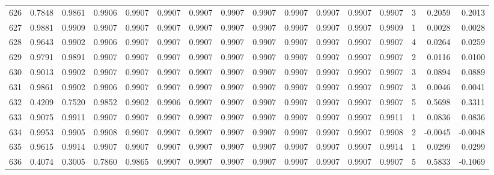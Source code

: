 \begin{tabular}{lrrrrrrrrrrrrrrr}
626 &      0.7848 &  0.9861 &  0.9906 &  0.9907 &  0.9907 &  0.9907 &  0.9907 &  0.9907 &  0.9907 &  0.9907 &   0.9907 &     0.9907 &      3 &                    0.2059 &                     0.2013 \\
627 &      0.9881 &  0.9909 &  0.9907 &  0.9907 &  0.9907 &  0.9907 &  0.9907 &  0.9907 &  0.9907 &  0.9907 &   0.9907 &     0.9909 &      1 &                    0.0028 &                     0.0028 \\
628 &      0.9643 &  0.9902 &  0.9906 &  0.9907 &  0.9907 &  0.9907 &  0.9907 &  0.9907 &  0.9907 &  0.9907 &   0.9907 &     0.9907 &      4 &                    0.0264 &                     0.0259 \\
629 &      0.9791 &  0.9891 &  0.9907 &  0.9907 &  0.9907 &  0.9907 &  0.9907 &  0.9907 &  0.9907 &  0.9907 &   0.9907 &     0.9907 &      2 &                    0.0116 &                     0.0100 \\
630 &      0.9013 &  0.9902 &  0.9907 &  0.9907 &  0.9907 &  0.9907 &  0.9907 &  0.9907 &  0.9907 &  0.9907 &   0.9907 &     0.9907 &      3 &                    0.0894 &                     0.0889 \\
631 &      0.9861 &  0.9902 &  0.9906 &  0.9907 &  0.9907 &  0.9907 &  0.9907 &  0.9907 &  0.9907 &  0.9907 &   0.9907 &     0.9907 &      3 &                    0.0046 &                     0.0041 \\
632 &      0.4209 &  0.7520 &  0.9852 &  0.9902 &  0.9906 &  0.9907 &  0.9907 &  0.9907 &  0.9907 &  0.9907 &   0.9907 &     0.9907 &      5 &                    0.5698 &                     0.3311 \\
633 &      0.9075 &  0.9911 &  0.9907 &  0.9907 &  0.9907 &  0.9907 &  0.9907 &  0.9907 &  0.9907 &  0.9907 &   0.9907 &     0.9911 &      1 &                    0.0836 &                     0.0836 \\
634 &      0.9953 &  0.9905 &  0.9908 &  0.9907 &  0.9907 &  0.9907 &  0.9907 &  0.9907 &  0.9907 &  0.9907 &   0.9907 &     0.9908 &      2 &                   -0.0045 &                    -0.0048 \\
635 &      0.9615 &  0.9914 &  0.9907 &  0.9907 &  0.9907 &  0.9907 &  0.9907 &  0.9907 &  0.9907 &  0.9907 &   0.9907 &     0.9914 &      1 &                    0.0299 &                     0.0299 \\
636 &      0.4074 &  0.3005 &  0.7860 &  0.9865 &  0.9907 &  0.9907 &  0.9907 &  0.9907 &  0.9907 &  0.9907 &   0.9907 &     0.9907 &      5 &                    0.5833 &                    -0.1069 \\

\end{tabular}
